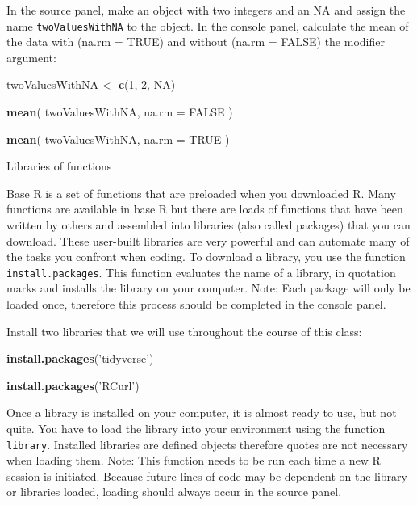 \documentclass[]{article}
\newenvironment{Shaded}{\begin{snugshade}}{\end{snugshade}}
\newcommand{\KeywordTok}[1]{\textcolor[rgb]{0.13,0.29,0.53}{\textbf{#1}}}
\newcommand{\DataTypeTok}[1]{\textcolor[rgb]{0.13,0.29,0.53}{#1}}
\newcommand{\DecValTok}[1]{\textcolor[rgb]{0.00,0.00,0.81}{#1}}
\newcommand{\StringTok}[1]{\textcolor[rgb]{0.31,0.60,0.02}{#1}}
\newcommand{\OtherTok}[1]{\textcolor[rgb]{0.56,0.35,0.01}{#1}}
\newcommand{\NormalTok}[1]{#1}
\begin{document}
 In the source panel, make an object with two integers and an NA and
assign the name \texttt{twoValuesWithNA} to the object. In the console
panel, calculate the mean of the data with (na.rm = TRUE) and without
(na.rm = FALSE) the modifier argument:

\begin{Shaded}
\begin{Highlighting}[]
\NormalTok{twoValuesWithNA <-}\StringTok{ }
\StringTok{  }\KeywordTok{c}\NormalTok{(}\DecValTok{1}\NormalTok{, }\DecValTok{2}\NormalTok{, }\OtherTok{NA}\NormalTok{)}

\KeywordTok{mean}\NormalTok{(}
\NormalTok{  twoValuesWithNA,}
  \DataTypeTok{na.rm =} \OtherTok{FALSE}
\NormalTok{)}

\KeywordTok{mean}\NormalTok{(}
\NormalTok{  twoValuesWithNA,}
  \DataTypeTok{na.rm =} \OtherTok{TRUE}
\NormalTok{)}
\end{Highlighting}
\end{Shaded}

Libraries of functions

Base R is a set of functions that are preloaded when you downloaded R.
Many functions are available in base R but there are loads of functions
that have been written by others and assembled into libraries (also
called packages) that you can download. These user-built libraries are
very powerful and can automate many of the tasks you confront when
coding. To download a library, you use the function
\texttt{install.packages}. This function evaluates the name of a
library, in quotation marks and installs the library on your computer.
Note: Each package will only be loaded once, therefore this process
should be completed in the console panel.

 Install two libraries that we will use throughout the course of this
class:

\begin{Shaded}
\begin{Highlighting}[]
\KeywordTok{install.packages}\NormalTok{(}\StringTok{'tidyverse'}\NormalTok{)}

\KeywordTok{install.packages}\NormalTok{(}\StringTok{'RCurl'}\NormalTok{)}
\end{Highlighting}
\end{Shaded}

Once a library is installed on your computer, it is almost ready to use,
but not quite. You have to load the library into your environment using
the function \texttt{library}. Installed libraries are defined objects
therefore quotes are not necessary when loading them. Note: This
function needs to be run each time a new R session is initiated. Because
future lines of code may be dependent on the library or libraries
loaded, loading should always occur in the source panel.
\end{document}
